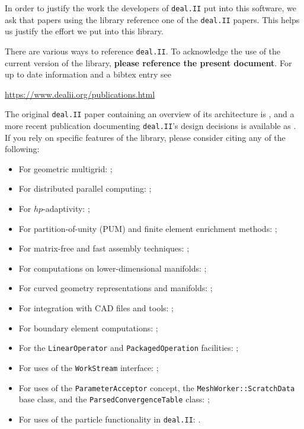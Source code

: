 \documentclass{ansarticle-preprint}
\newcommand{\specialword}[1]{\texttt{#1}}
\newcommand{\dealii}{{\specialword{deal.II}}\xspace}
\begin{document}
In order to justify the work the developers of \dealii{} put into this
software, we ask that papers using the library reference one of the
\dealii{} papers. This helps us justify the effort we put into this library.

There are various ways to reference \dealii{}. To acknowledge the use of
the current version of the library, \textbf{please reference the present
  document}. For up to date information and a bibtex entry
see
\begin{center}
  \url{https://www.dealii.org/publications.html}
\end{center}

The original \dealii{} paper containing an overview of its
architecture is \cite{BangerthHartmannKanschat2007}, and a more recent
publication documenting \dealii{}'s design decisions is available as \cite{dealII2020design}. If you rely on
specific features of the library, please consider citing any of the
following:
\begin{multicols}{2}
  \vspace*{-36pt}
  \begin{itemize}
    \item For geometric multigrid: \cite{Kanschat2004,JanssenKanschat2011,ClevengerHeisterKanschatKronbichler2019};
    \item For distributed parallel computing: \cite{BangerthBursteddeHeisterKronbichler11};
    \item For $hp$-adaptivity: \cite{BangerthKayserHerold2007};
    \item For partition-of-unity (PUM) and finite element enrichment methods:
           \cite{Davydov2016};
    \item For matrix-free and fast assembly techniques:
          \cite{KronbichlerKormann2012,KronbichlerKormann2019};
    \item For computations on lower-dimensional manifolds:
          \cite{DeSimoneHeltaiManigrasso2009};
    \item For curved geometry representations and manifolds:
          \cite{HeltaiBangerthKronbichlerMola2019};
    \item For integration with CAD files and tools:
          \cite{HeltaiMola2015};
    \item For boundary element computations:
          \cite{GiulianiMolaHeltai-2018-a};
    \item For the \texttt{LinearOperator} and
      \texttt{Packaged\-Operation} facilities:
          \cite{MaierBardelloniHeltai-2016-a,MaierBardelloniHeltai-2016-b};
    \item For uses of the \texttt{WorkStream} interface:
          \cite{TKB16};
    \item For uses of the \texttt{ParameterAcceptor} concept, the
          \texttt{MeshWorker::ScratchData} base class, and the
          \texttt{ParsedConvergenceTable} class:
          \cite{SartoriGiulianiBardelloni-2018-a};
    \item For uses of the particle functionality in \dealii{}:
          \cite{GLHPB18}.
          \vfill\null
  \end{itemize}
\end{multicols}
\end{document}
